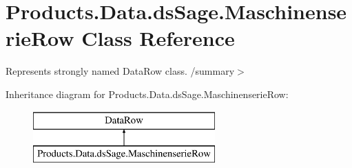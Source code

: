 \hypertarget{class_products_1_1_data_1_1ds_sage_1_1_maschinenserie_row}{}\section{Products.\+Data.\+ds\+Sage.\+Maschinenserie\+Row Class Reference}
\label{class_products_1_1_data_1_1ds_sage_1_1_maschinenserie_row}


Represents strongly named Data\+Row class. /summary$>$  


Inheritance diagram for Products.\+Data.\+ds\+Sage.\+Maschinenserie\+Row\+:\begin{figure}[H]
\begin{center}
\leavevmode
\includegraphics[height=2.000000cm]{class_products_1_1_data_1_1ds_sage_1_1_maschinenserie_row}
\end{center}
\end{figure}
